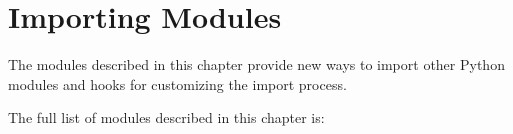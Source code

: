 \chapter{Importing Modules}
\label{modules}

The modules described in this chapter provide new ways to import other
Python modules and hooks for customizing the import process.

The full list of modules described in this chapter is:

\localmoduletable
